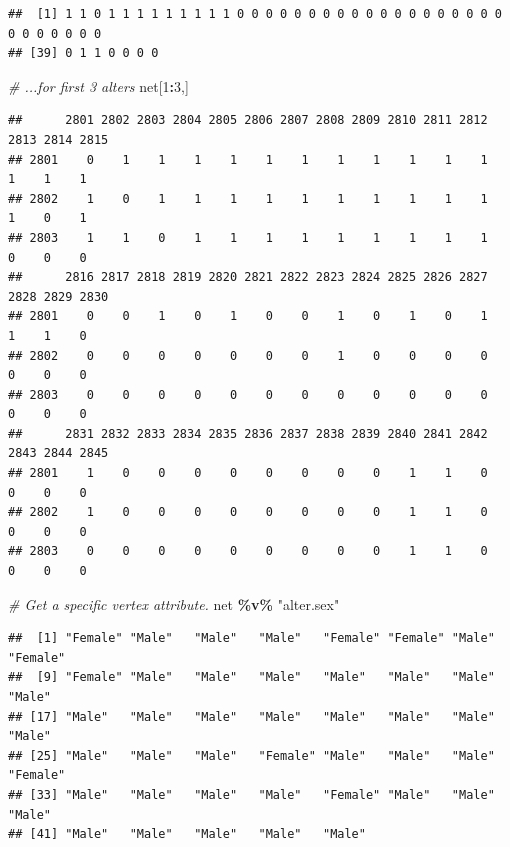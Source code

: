 \documentclass[
]{book}
\newenvironment{Shaded}{\begin{snugshade}}{\end{snugshade}}
\newcommand{\CommentTok}[1]{\textcolor[rgb]{0.56,0.35,0.01}{\textit{#1}}}
\newcommand{\DecValTok}[1]{\textcolor[rgb]{0.00,0.00,0.81}{#1}}
\newcommand{\NormalTok}[1]{#1}
\newcommand{\SpecialCharTok}[1]{\textcolor[rgb]{0.81,0.36,0.00}{\textbf{#1}}}
\newcommand{\StringTok}[1]{\textcolor[rgb]{0.31,0.60,0.02}{#1}}
\begin{document}
\begin{verbatim}
##  [1] 1 1 0 1 1 1 1 1 1 1 1 1 0 0 0 0 0 0 0 0 0 0 0 0 0 0 0 0 0 0 0 0 0 0 0 0 0 0
## [39] 0 1 1 0 0 0 0
\end{verbatim}

\begin{Shaded}
\begin{Highlighting}[]
\CommentTok{\# ...for first 3 alters}
\NormalTok{net[}\DecValTok{1}\SpecialCharTok{:}\DecValTok{3}\NormalTok{,]}
\end{Highlighting}
\end{Shaded}

\begin{verbatim}
##      2801 2802 2803 2804 2805 2806 2807 2808 2809 2810 2811 2812 2813 2814 2815
## 2801    0    1    1    1    1    1    1    1    1    1    1    1    1    1    1
## 2802    1    0    1    1    1    1    1    1    1    1    1    1    1    0    1
## 2803    1    1    0    1    1    1    1    1    1    1    1    1    0    0    0
##      2816 2817 2818 2819 2820 2821 2822 2823 2824 2825 2826 2827 2828 2829 2830
## 2801    0    0    1    0    1    0    0    1    0    1    0    1    1    1    0
## 2802    0    0    0    0    0    0    0    1    0    0    0    0    0    0    0
## 2803    0    0    0    0    0    0    0    0    0    0    0    0    0    0    0
##      2831 2832 2833 2834 2835 2836 2837 2838 2839 2840 2841 2842 2843 2844 2845
## 2801    1    0    0    0    0    0    0    0    0    1    1    0    0    0    0
## 2802    1    0    0    0    0    0    0    0    0    1    1    0    0    0    0
## 2803    0    0    0    0    0    0    0    0    0    1    1    0    0    0    0
\end{verbatim}

\begin{Shaded}
\begin{Highlighting}[]
\CommentTok{\# Get a specific vertex attribute.}
\NormalTok{net }\SpecialCharTok{\%v\%} \StringTok{"alter.sex"}
\end{Highlighting}
\end{Shaded}

\begin{verbatim}
##  [1] "Female" "Male"   "Male"   "Male"   "Female" "Female" "Male"   "Female"
##  [9] "Female" "Male"   "Male"   "Male"   "Male"   "Male"   "Male"   "Male"  
## [17] "Male"   "Male"   "Male"   "Male"   "Male"   "Male"   "Male"   "Male"  
## [25] "Male"   "Male"   "Male"   "Female" "Male"   "Male"   "Male"   "Female"
## [33] "Male"   "Male"   "Male"   "Male"   "Female" "Male"   "Male"   "Male"  
## [41] "Male"   "Male"   "Male"   "Male"   "Male"
\end{verbatim}
\end{document}
